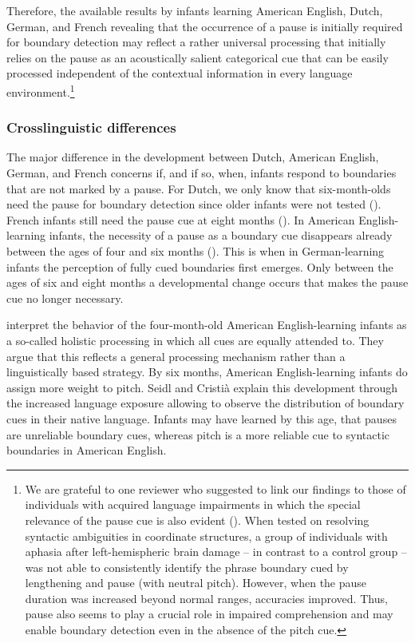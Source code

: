 \documentclass[output=paper]{langscibook}
\begin{document}
Therefore, the available results by infants learning American English, Dutch, German, and French revealing that the occurrence of a pause is initially required for boundary detection may reflect a rather universal processing that initially relies on the pause as an acoustically salient categorical cue that can be easily processed independent of the contextual information in every language environment.\footnote{We are grateful to one reviewer who suggested to link our findings to those of individuals with acquired language impairments in which the special relevance of the pause cue is also evident (\citealt{Aasland2003}). When tested on resolving syntactic ambiguities in coordinate structures, a group of individuals with aphasia after left-hemispheric brain damage – in contrast to a control group – was not able to consistently identify the phrase boundary cued by lengthening and pause (with neutral pitch). However, when the pause duration was increased beyond normal ranges, accuracies improved. Thus, pause also seems to play a crucial role in impaired comprehension and may enable boundary detection even in the absence of the pitch cue.}

\subsubsection{Crosslinguistic differences}
The major difference in the development between Dutch, American English, German, and French concerns if, and if so, when, infants respond to boundaries that are not marked by a pause. For Dutch, we only know that six-month-olds need the pause for boundary detection since older infants were not tested (\citealt{Johnson2008}). French infants still need the pause cue at eight months (\citealt{VanOmmen2020}). In American English-learning infants, the necessity of a pause as a boundary cue disappears already between the ages of four and six months (\citealt{Seidl2007, Seidl2008}). This is when in German-learning infants the perception of fully cued boundaries first emerges. Only between the ages of six and eight months a developmental change occurs that makes the pause cue no longer necessary.

\citet{Seidl2008} interpret the behavior of the four-month-old American English-learning infants as a so-called holistic processing in which all cues are equally attended to. They argue that this reflects a general processing mechanism rather than a linguistically based strategy. By six months, American English-learning infants do assign more weight to pitch. Seidl and Cristià explain this development through the increased language exposure allowing to observe the distribution of boundary cues in their native language. Infants may have learned by this age, that pauses are unreliable boundary cues, whereas pitch is a more reliable cue to syntactic boundaries in American English.
\end{document}
